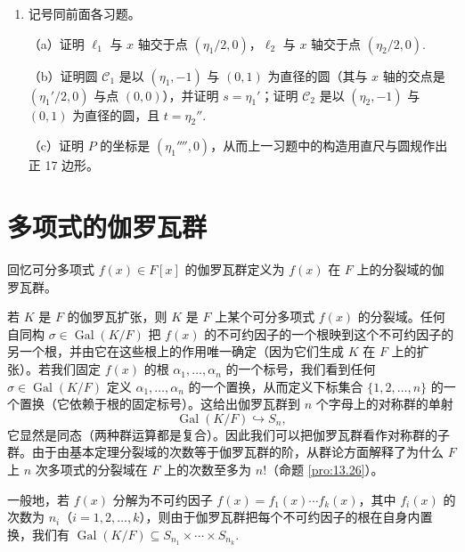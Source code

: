 \begin{enumerate}
（c）在点 \(A\) 处作 \(x\) 轴的垂线，并在其上截取从 \((0, 0)\) 到 \(B\) 的距离 \(t\)，构造点 \((s, t)\). 以 \((s, t)\) 与 \((0, 1)\) 为直径作圆，设 \(P\) 表示这个圆与 \(x\) 轴交点的右端。在 \(P\) 处作 \(x\) 轴的垂线，它与半径 2 的圆交于正 17 边形的第二个顶点（第一个顶点在 \((2, 0)\)），从而用直尺与圆规作出正 17 边形。

\item 记号同前面各习题。

（a）证明 \(\ell_1\) 与 \(x\) 轴交于点 \((\eta_1/2, 0)\)，\(\ell_2\) 与 \(x\) 轴交于点 \((\eta_2/2, 0)\).

（b）证明圆 \(\mathcal{C}_1\) 是以 \((\eta_1, -1)\) 与 \((0, 1)\) 为直径的圆（其与 \(x\) 轴的交点是 \((\eta_1'/2, 0)\) 与点 \((0, 0)\)），并证明 \(s = \eta_1'\)；证明 \(\mathcal{C}_2\) 是以 \((\eta_2, -1)\) 与 \((0, 1)\) 为直径的圆，且 \(t = \eta_2''\).

（c）证明 \(P\) 的坐标是 \((\eta_1'''', 0)\)，从而上一习题中的构造用直尺与圆规作出正 17 边形。
\end{enumerate}

\section{多项式的伽罗瓦群}

回忆可分多项式 \(f(x) \in F[x]\) 的伽罗瓦群定义为 \(f(x)\) 在 \(F\) 上的分裂域的伽罗瓦群。

若 \(K\) 是 \(F\) 的伽罗瓦扩张，则 \(K\) 是 \(F\) 上某个可分多项式 \(f(x)\) 的分裂域。任何自同构 \(\sigma \in \operatorname{Gal}(K/F)\) 把 \(f(x)\) 的不可约因子的一个根映到这个不可约因子的另一个根，并由它在这些根上的作用唯一确定（因为它们生成 \(K\) 在 \(F\) 上的扩张）。若我们固定 \(f(x)\) 的根 \(\alpha_1, \ldots, \alpha_n\) 的一个标号，我们看到任何 \(\sigma \in \operatorname{Gal}(K/F)\) 定义 \(\alpha_1, \ldots, \alpha_n\) 的一个置换，从而定义下标集合 \(\{1, 2, \ldots, n\}\) 的一个置换（它依赖于根的固定标号）。这给出伽罗瓦群到 \(n\) 个字母上的对称群的单射
\[
\operatorname{Gal}(K/F) \hookrightarrow S_n,
\]
它显然是同态（两种群运算都是复合）。因此我们可以把伽罗瓦群看作对称群的子群。由于由基本定理分裂域的次数等于伽罗瓦群的阶，从群论方面解释了为什么 \(F\) 上 \(n\) 次多项式的分裂域在 \(F\) 上的次数至多为 \(n!\)（命题 \ref{pro:13.26}）。

一般地，若 \(f(x)\) 分解为不可约因子 \(f(x) = f_1(x)\cdots f_k(x)\)，其中 \(f_i(x)\) 的次数为 \(n_i\)（\(i = 1, 2, \ldots, k\)），则由于伽罗瓦群把每个不可约因子的根在自身内置换，我们有 \(\operatorname{Gal}(K/F) \subseteq S_{n_1} \times \cdots \times S_{n_k}\).

